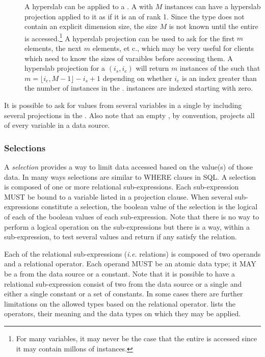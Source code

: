 \documentclass[justify]{nasa-ese}
\renewcommand{\Tableref}[2][here]{\texorhtml{Table~\ref{#2}}{\link{#1}{#2}}}
\renewcommand{\new}[1]{\emph{#1}}
\begin{document}
\begin{description}
\item[\Sequence] A hyperslab can be applied to a \Sequence. A
  \Sequence with $M$ instances can have a hyperslab projection applied
  to it as if it is an \Array of rank 1. Since the \Sequence type does
  not contain an explicit dimension size, the size $M$ is not known
  until the entire \Sequence is accessed.\footnote{For many \Sequence
    variables, it may never be the case that the entire \Sequence is
    accessed since it may contain millons of instances.} A hyperslab
  projection can be used to ask for the first $m$ elements, the next
  $m$ elements, et c., which may be very useful for clients which need
  to know the sizes of varaibles before accessing them. A hyperslab
  projection for a \Sequence $(i_{s}, i_{e})$ will return $m$
  instances of the \Sequence such that $m = \lfloor i_{e}, M-1 \rfloor
  - i_{s} + 1$ depending on whether $i_{e}$ is an index greater than
  the number of instances in the \Sequence. \Sequence instances are
  indexed starting with zero.
\end{description}

It is possible to ask for values from several variables in a single \CE by
including several projections in the \CE. Also note that an empty \CE, by
convention, projects all of every variable in a data source.

\subsubsection{Selections}
\label{sec-ce-selections}


A \new{selection} provides a way to limit data accessed based on the value(s)
of those data. In many ways selections are similar to WHERE claues in
SQL\cite{date:DBMS}. A selection is composed of one or more relational
sub-expressions. Each sub-expression MUST be bound to a variable listed in a
projection clause. When several sub-expressions constitute a selection, the
boolean value of the selection is the logical  of each of the
boolean values of each sub-expression. Note that there is no way to perform a
logical  operation on the sub-expressions but there is a way, within
a sub-expression, to test several values and return  if any satisfy
the relation.

Each of the relational sub-expressions ({\it i.e.} relations) is
composed of two operands and a relational operator. Each operand MUST
be an atomic data type; it MAY be a \FQN from the data source or a
constant. Note that it is possible to have a relational sub-expression
consist of two \FQNs from the data source or a single \FQN and either
a single constant or a set of constants. In some cases there are
further limitations on the allowed types based on the relational
operator. \Tableref[Figure 5]{tab-ce-relations} lists the operators,
their meaning and the data types on which they may be applied.
\end{document}
